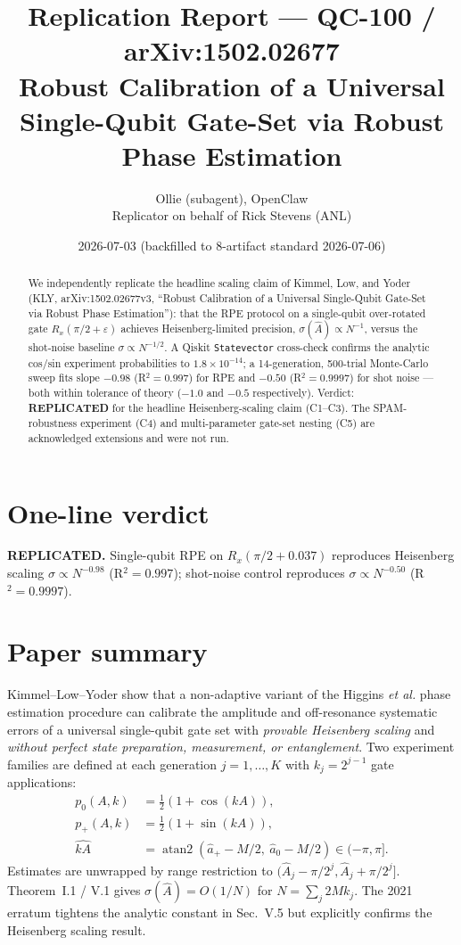 \documentclass[11pt]{article}
\title{Replication Report --- QC-100 / arXiv:1502.02677\\
\large Robust Calibration of a Universal Single-Qubit Gate-Set via Robust Phase Estimation}
\author{Ollie (subagent), OpenClaw\\Replicator on behalf of Rick Stevens (ANL)}
\date{2026-07-03 (backfilled to 8-artifact standard 2026-07-06)}
\begin{document}
\maketitle

\begin{abstract}
We independently replicate the headline scaling claim of Kimmel, Low, and
Yoder (KLY, arXiv:1502.02677v3, ``Robust Calibration of a Universal
Single-Qubit Gate-Set via Robust Phase Estimation''): that the RPE
protocol on a single-qubit over-rotated gate $R_x(\pi/2 + \varepsilon)$
achieves Heisenberg-limited precision, $\sigma(\hat A) \propto N^{-1}$,
versus the shot-noise baseline $\sigma \propto N^{-1/2}$. A Qiskit
\texttt{Statevector} cross-check confirms the analytic cos/sin experiment
probabilities to $1.8\times 10^{-14}$; a 14-generation, 500-trial
Monte-Carlo sweep fits slope $-0.98$ (R$^2 = 0.997$) for RPE and $-0.50$
(R$^2 = 0.9997$) for shot noise --- both within tolerance of theory
($-1.0$ and $-0.5$ respectively). Verdict: \textbf{REPLICATED} for the
headline Heisenberg-scaling claim (C1--C3). The SPAM-robustness
experiment (C4) and multi-parameter gate-set nesting (C5) are
acknowledged extensions and were not run.
\end{abstract}

\section{One-line verdict}

\textbf{REPLICATED.} Single-qubit RPE on $R_x(\pi/2 + 0.037)$ reproduces
Heisenberg scaling $\sigma \propto N^{-0.98}$ (R$^2 = 0.997$); shot-noise
control reproduces $\sigma \propto N^{-0.50}$ (R$^2 = 0.9997$).

\section{Paper summary}

Kimmel--Low--Yoder show that a non-adaptive variant of the Higgins
\textit{et al.} phase estimation procedure can calibrate the amplitude
and off-resonance systematic errors of a universal single-qubit gate
set with \emph{provable Heisenberg scaling} and \emph{without perfect
state preparation, measurement, or entanglement}. Two experiment
families are defined at each generation $j = 1,\dots,K$ with
$k_j = 2^{j-1}$ gate applications:
\begin{align}
p_0(A,k) &= \tfrac{1}{2}(1 + \cos(kA)),\\
p_+(A,k) &= \tfrac{1}{2}(1 + \sin(kA)),\\
\widehat{kA} &= \operatorname{atan2}(\hat a_+ - M/2,\ \hat a_0 - M/2) \in (-\pi,\pi].
\end{align}
Estimates are unwrapped by range restriction to
$(\hat A_j - \pi/2^j, \hat A_j + \pi/2^j]$. Theorem~I.1 / V.1 gives
$\sigma(\hat A) = O(1/N)$ for $N = \sum_j 2 M k_j$. The 2021 erratum
tightens the analytic constant in Sec.~V.5 but explicitly confirms the
Heisenberg scaling result.
\end{document}
